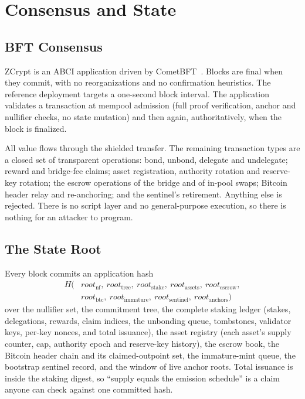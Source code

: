 \documentclass[twocolumn,10pt]{article}
\begin{document}
\section{Consensus and State}
\label{sec:consensus}

\subsection{BFT Consensus}

ZCrypt is an ABCI application driven by CometBFT~\cite{tendermint}. Blocks are final when they commit, with no reorganizations and no confirmation heuristics. The reference deployment targets a one-second block interval. The application validates a transaction at mempool admission (full proof verification, anchor and nullifier checks, no state mutation) and then again, authoritatively, when the block is finalized.

All value flows through the shielded transfer. The remaining transaction types are a closed set of transparent operations: bond, unbond, delegate and undelegate; reward and bridge-fee claims; asset registration, authority rotation and reserve-key rotation; the escrow operations of the bridge and of in-pool swaps; Bitcoin header relay and re-anchoring; and the sentinel's retirement. Anything else is rejected. There is no script layer and no general-purpose execution, so there is nothing for an attacker to program.

\subsection{The State Root}

Every block commits an application hash
\[
\begin{aligned}
H\bigl(&\mathit{root}_{\mathrm{nf}},\ \mathit{root}_{\mathrm{tree}},\ \mathit{root}_{\mathrm{stake}},\ \mathit{root}_{\mathrm{assets}},\ \mathit{root}_{\mathrm{escrow}},\\
&\mathit{root}_{\mathrm{btc}},\ \mathit{root}_{\mathrm{immature}},\ \mathit{root}_{\mathrm{sentinel}},\ \mathit{root}_{\mathrm{anchors}}\bigr)
\end{aligned}
\]
over the nullifier set, the commitment tree, the complete staking ledger (stakes, delegations, rewards, claim indices, the unbonding queue, tombstones, validator keys, per-key nonces, and total issuance), the asset registry (each asset's supply counter, cap, authority epoch and reserve-key history), the escrow book, the Bitcoin header chain and its claimed-outpoint set, the immature-mint queue, the bootstrap sentinel record, and the window of live anchor roots. Total issuance is inside the staking digest, so ``supply equals the emission schedule'' is a claim anyone can check against one committed hash.
\end{document}
